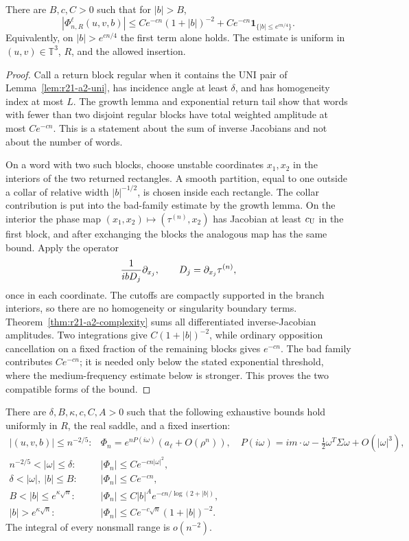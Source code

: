 \begin{lemma}
\label{lem:r21-a2-coarea}
There are $B,c,C>0$ such that for $|b|>B$,
\[
 |\Phi_{n,R}^{\ell}(u,v,b)|
 \le Ce^{-cn}(1+|b|)^{-2}+Ce^{-cn}
       \mathbf1_{\{|b|\le e^{c n/4}\}} .
\]
Equivalently, on $|b|>e^{c n/4}$ the first term alone holds.  The estimate is
uniform in $(u,v)\in\mathbb T^3$, $R$, and the allowed insertion.
\end{lemma}

\begin{proof}
Call a return block regular when it contains the UNI pair of
Lemma~\ref{lem:r21-a2-uni}, has incidence angle at least $\delta$, and has
homogeneity index at most $L$.  The growth lemma and exponential return tail
show that words with fewer than two disjoint regular blocks have total
weighted amplitude at most $Ce^{-cn}$.  This is a statement about the sum of
inverse Jacobians and not about the number of words.

On a word with two such blocks, choose unstable coordinates $x_1,x_2$ in the
interiors of the two returned rectangles.  A smooth partition, equal to one
outside a collar of relative width $|b|^{-1/2}$, is chosen inside each
rectangle.  The collar contribution is put into the bad-family estimate by
the growth lemma.  On the interior the phase map
$(x_1,x_2)\mapsto(\tau^{(n)},x_2)$ has Jacobian at least $c_{\rm U}$ in the
first block, and after exchanging the blocks the analogous map has the same
bound.  Apply the operator
\[
 {1\over ibD_j}\partial_{x_j},
 \qquad D_j=\partial_{x_j}\tau^{(n)},
\]
once in each coordinate.  The cutoffs are compactly supported in the branch
interiors, so there are no homogeneity or singularity boundary terms.
Theorem~\ref{thm:r21-a2-complexity} sums all differentiated inverse-Jacobian
amplitudes.  Two integrations give $C(1+|b|)^{-2}$, while ordinary
opposition cancellation on a fixed fraction of the remaining blocks gives
$e^{-cn}$.  The bad family contributes $Ce^{-cn}$; it is needed only below the
stated exponential threshold, where the medium-frequency estimate below is
stronger.  This proves the two compatible forms of the bound.
\end{proof}

\begin{theorem}
\label{thm:r21-a2-fourier}
There are $\delta,B,\kappa,c,C,A>0$ such that the following exhaustive bounds
hold uniformly in $R$, the real saddle, and a fixed insertion:
\[
\begin{array}{ll}
|(u,v,b)|\le n^{-2/5}:&
 \Phi_n=e^{nP(i\omega)}(a_\ell+O(\rho^n)),\quad
 P(i\omega)=im\cdot\omega-\frac12\omega^T\Sigma\omega+O(|\omega|^3),\\[1mm]
n^{-2/5}<|\omega|\le\delta:&
 |\Phi_n|\le Ce^{-cn|\omega|^2},\\[1mm]
\delta<|\omega|,\ |b|\le B:&
 |\Phi_n|\le Ce^{-cn},\\[1mm]
B<|b|\le e^{\kappa\sqrt n}:&
 |\Phi_n|\le C|b|^Ae^{-cn/\log(2+|b|)},\\[1mm]
|b|>e^{\kappa\sqrt n}:&
 |\Phi_n|\le Ce^{-c\sqrt n}(1+|b|)^{-2}.
\end{array}
\]
The integral of every nonsmall range is $o(n^{-2})$.
\end{theorem}

